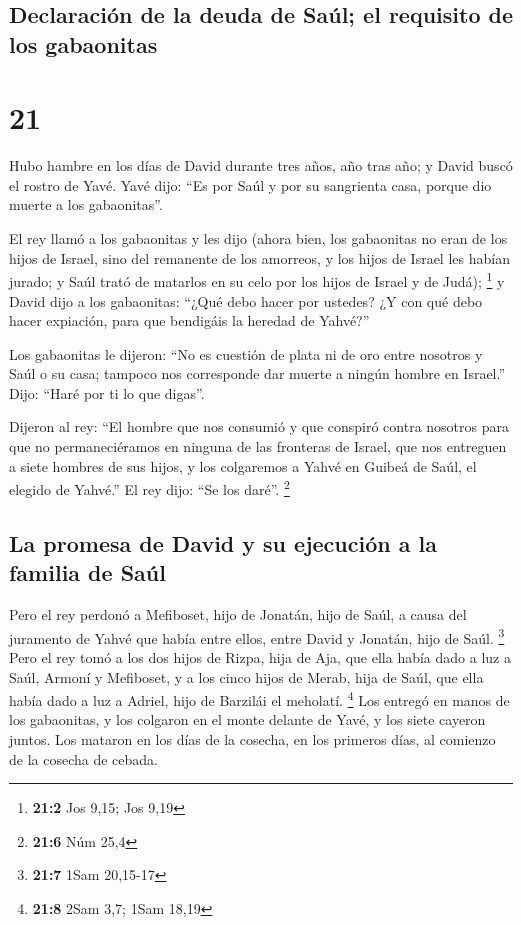 \hypertarget{declaraciuxf3n-de-la-deuda-de-sauxfal-el-requisito-de-los-gabaonitas}{%
\subsection{Declaración de la deuda de Saúl; el requisito de los
gabaonitas}\label{declaraciuxf3n-de-la-deuda-de-sauxfal-el-requisito-de-los-gabaonitas}}

\hypertarget{section-20}{%
\section{21}\label{section-20}}

 Hubo hambre en los días de David durante tres años, año
tras año; y David buscó el rostro de Yavé. Yavé dijo: ``Es por Saúl y
por su sangrienta casa, porque dio muerte a los gabaonitas''.

 El rey llamó a los gabaonitas y les dijo (ahora bien, los
gabaonitas no eran de los hijos de Israel, sino del remanente de los
amorreos, y los hijos de Israel les habían jurado; y Saúl trató de
matarlos en su celo por los hijos de Israel y de Judá); \footnote{\textbf{21:2}
  Jos 9,15; Jos 9,19}  y David dijo a los gabaonitas:
``¿Qué debo hacer por ustedes? ¿Y con qué debo hacer expiación, para que
bendigáis la heredad de Yahvé?''

 Los gabaonitas le dijeron: ``No es cuestión de plata ni
de oro entre nosotros y Saúl o su casa; tampoco nos corresponde dar
muerte a ningún hombre en Israel.'' Dijo: ``Haré por ti lo que digas''.

 Dijeron al rey: ``El hombre que nos consumió y que
conspiró contra nosotros para que no permaneciéramos en ninguna de las
fronteras de Israel,  que nos entreguen a siete hombres de
sus hijos, y los colgaremos a Yahvé en Guibeá de Saúl, el elegido de
Yahvé.'' El rey dijo: ``Se los daré''. \footnote{\textbf{21:6} Núm 25,4}

\hypertarget{la-promesa-de-david-y-su-ejecuciuxf3n-a-la-familia-de-sauxfal}{%
\subsection{La promesa de David y su ejecución a la familia de
Saúl}\label{la-promesa-de-david-y-su-ejecuciuxf3n-a-la-familia-de-sauxfal}}

 Pero el rey perdonó a Mefiboset, hijo de Jonatán, hijo de
Saúl, a causa del juramento de Yahvé que había entre ellos, entre David
y Jonatán, hijo de Saúl. \footnote{\textbf{21:7} 1Sam 20,15-17}
 Pero el rey tomó a los dos hijos de Rizpa, hija de Aja,
que ella había dado a luz a Saúl, Armoní y Mefiboset, y a los cinco
hijos de Merab, hija de Saúl, que ella había dado a luz a Adriel, hijo
de Barzilái el meholatí. \footnote{\textbf{21:8} 2Sam 3,7; 1Sam 18,19}
 Los entregó en manos de los gabaonitas, y los colgaron en
el monte delante de Yavé, y los siete cayeron juntos. Los mataron en los
días de la cosecha, en los primeros días, al comienzo de la cosecha de
cebada.


